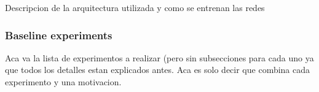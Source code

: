 \documentclass[num-refs]{wiley-article}
\begin{document}
Descripcion de la arquitectura utilizada y como se entrenan las redes


\subsubsection{Baseline experiments}

Aca va la lista de experimentos a realizar (pero sin subsecciones para cada uno ya que todos los detalles estan explicados antes. Aca es solo decir que combina cada experimento y una motivacion. 










\end{document}
